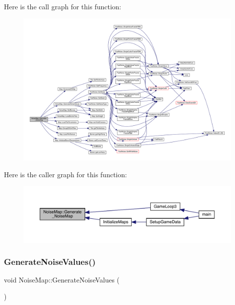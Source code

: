 Here is the call graph for this function\+:
\nopagebreak
\begin{figure}[H]
\begin{center}
\leavevmode
\includegraphics[width=350pt]{d1/dd4/class_noise_map_a551072fd54a96722c96dea40dc24940e_cgraph}
\end{center}
\end{figure}
Here is the caller graph for this function\+:
\nopagebreak
\begin{figure}[H]
\begin{center}
\leavevmode
\includegraphics[width=350pt]{d1/dd4/class_noise_map_a551072fd54a96722c96dea40dc24940e_icgraph}
\end{center}
\end{figure}
\mbox{\label{class_noise_map_aa9ba8032c97f9a5ea9f63c697b2f20e4}} 
\subsubsection{\texorpdfstring{Generate\+Noise\+Values()}{GenerateNoiseValues()}}
{\footnotesize\ttfamily void Noise\+Map\+::\+Generate\+Noise\+Values (\begin{DoxyParamCaption}{ }\end{DoxyParamCaption})}

